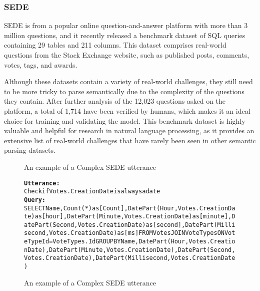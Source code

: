 \subsubsection{SEDE}

\ac{SEDE} \cite{DBLP:journals/corr/abs-2106-05006} is from a popular online question-and-answer platform with more than 3 million questions, and it recently released a benchmark dataset of SQL queries containing 29 tables and 211 columns. This dataset comprises real-world questions from the Stack Exchange website, such as published posts, comments, votes, tags, and awards.

Although these datasets contain a variety of real-world challenges, they still need to be more tricky to parse semantically due to the complexity of the questions they contain. After further analysis of the 12,023 questions asked on the platform, a total of 1,714 have been verified by humans, which makes it an ideal choice for training and validating the model. This benchmark dataset is highly valuable and helpful for research in natural language processing, as it provides an extensive list of real-world challenges that have rarely been seen in other semantic parsing datasets.

\begin{figure}[H]
    \label{fig:sede_sql}
    \begin{AIbox}{An example of a Complex SEDE utterance}
        \vspace{-5px}
        \parbox{1\textwidth}{\scriptsize
        \begin{alltt} \larger
            {\bf Utterance:} \\ 
            Check if Votes.CreationDate is always a date
            \\
            {\bf Query:} \\
            SELECT Name, Count(*)as [Count], DatePart(Hour, Votes.CreationDate)as [hour],DatePart(Minute, Votes.CreationDate)as [minute],DatePart(Second, Votes.CreationDate)as [second],DatePart(Millisecond, Votes.CreationDate)as [ms] FROM Votes JOIN VoteTypes ON VoteTypeId = VoteTypes.Id GROUP BY Name, DatePart(Hour, Votes.CreationDate),DatePart(Minute, Votes.CreationDate),DatePart(Second, Votes.CreationDate),DatePart(Millisecond, Votes.CreationDate)
        \end{alltt}
        }
        \vspace{-5px}
    \end{AIbox}
    
    \caption{An example of a Complex SEDE utterance}
\end{figure}
